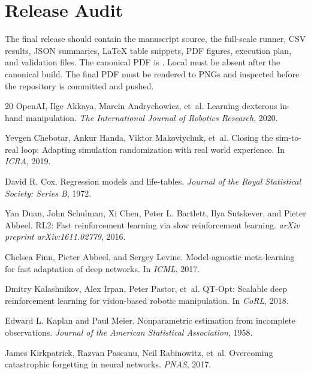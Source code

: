 \documentclass{article}
\begin{document}
\section{Release Audit}

The final release should contain the manuscript source, the full-scale runner,
CSV results, JSON summaries, LaTeX table snippets, PDF figures, execution plan,
and validation files. The canonical PDF is
. Local  must be absent after the
canonical build. The final PDF must be rendered to PNGs and inspected before
the repository is committed and pushed.

\begin{thebibliography}{20}
OpenAI, Ilge Akkaya, Marcin Andrychowicz, et~al. Learning dexterous in-hand
manipulation. \emph{The International Journal of Robotics Research}, 2020.

Yevgen Chebotar, Ankur Handa, Viktor Makoviychuk, et~al. Closing the sim-to-real
loop: Adapting simulation randomization with real world experience. In
\emph{ICRA}, 2019.

David R. Cox. Regression models and life-tables. \emph{Journal of the Royal
Statistical Society: Series B}, 1972.

Yan Duan, John Schulman, Xi Chen, Peter L. Bartlett, Ilya Sutskever, and Pieter
Abbeel. RL2: Fast reinforcement learning via slow reinforcement learning.
\emph{arXiv preprint arXiv:1611.02779}, 2016.

Chelsea Finn, Pieter Abbeel, and Sergey Levine. Model-agnostic meta-learning for
fast adaptation of deep networks. In \emph{ICML}, 2017.

Dmitry Kalashnikov, Alex Irpan, Peter Pastor, et~al. QT-Opt: Scalable deep
reinforcement learning for vision-based robotic manipulation. In \emph{CoRL},
2018.

Edward L. Kaplan and Paul Meier. Nonparametric estimation from incomplete
observations. \emph{Journal of the American Statistical Association}, 1958.

James Kirkpatrick, Razvan Pascanu, Neil Rabinowitz, et~al. Overcoming
catastrophic forgetting in neural networks. \emph{PNAS}, 2017.


\end{thebibliography}
\end{document}
